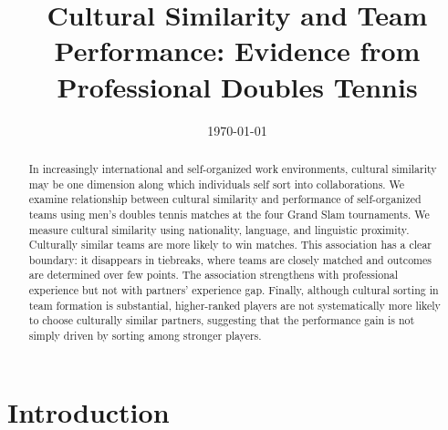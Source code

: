 \documentclass[10pt]{article}
\title{Cultural Similarity and Team Performance: Evidence from Professional Doubles Tennis}
\author{}
\date{\today}
\begin{document}
\maketitle
\thispagestyle{empty}

\begin{abstract}


In increasingly international and self-organized work environments, cultural similarity may be one dimension along which individuals self sort into collaborations. %
We examine relationship between cultural similarity and  performance of self-organized teams using men’s doubles tennis matches at the four Grand Slam tournaments. We measure cultural similarity using nationality,  language, and linguistic proximity. Culturally similar teams are more likely to win matches. This association has a clear boundary: it disappears in tiebreaks, where teams are closely matched and outcomes are determined over few points. The association strengthens with professional experience but not with partners' experience gap. Finally, although cultural sorting in team formation is substantial, higher-ranked players are not systematically more likely to choose culturally similar partners, suggesting that the performance gain is not simply driven by sorting among stronger players.
\end{abstract}
\newpage
\setcounter{page}{1}
\section{Introduction}
\end{document}
